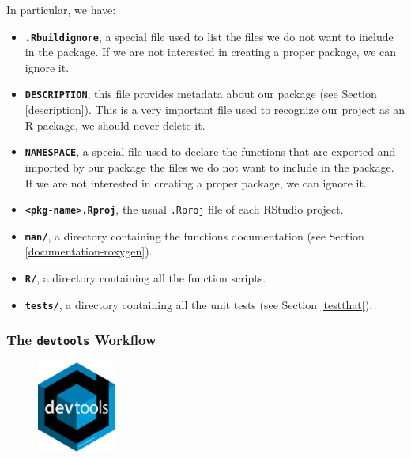 \documentclass[
  11pt,
]{book}
\providecommand{\tightlist}{%
  \setlength{\itemsep}{0pt}\setlength{\parskip}{0pt}}
\begin{document}
In particular, we have:

\begin{itemize}
\tightlist
\item
  \textbf{\texttt{.Rbuildignore}}, a special file used to list the files we do not want to include in the package. If we are not interested in creating a proper package, we can ignore it.
\item
  \textbf{\texttt{DESCRIPTION}}, this file provides metadata about our package (see Section \ref{description}). This is a very important file used to recognize our project as an R package, we should never delete it.
\item
  \textbf{\texttt{NAMESPACE}}, a special file used to declare the functions that are exported and imported by our package the files we do not want to include in the package. If we are not interested in creating a proper package, we can ignore it.
\item
  \textbf{\texttt{\textless{}pkg-name\textgreater{}.Rproj}}, the usual \texttt{.Rproj} file of each RStudio project.
\item
  \textbf{\texttt{man/}}, a directory containing the functions documentation (see Section \ref{documentation-roxygen}).
\item
  \textbf{\texttt{R/}}, a directory containing all the function scripts.
\item
  \textbf{\texttt{tests/}}, a directory containing all the unit tests (see Section \ref{testthat}).
\end{itemize}

\hypertarget{the-devtools-workflow}{%
\subsubsection{\texorpdfstring{The \texttt{devtools} Workflow}{The devtools Workflow}}\label{the-devtools-workflow}}

\begin{figure}
  \vspace*{-15pt}
  \begin{center}
    \includegraphics[width=0.23\textwidth]{images/coding/devtools.png}
  \end{center}
  \vspace{-15pt}
\end{figure}
\end{document}
